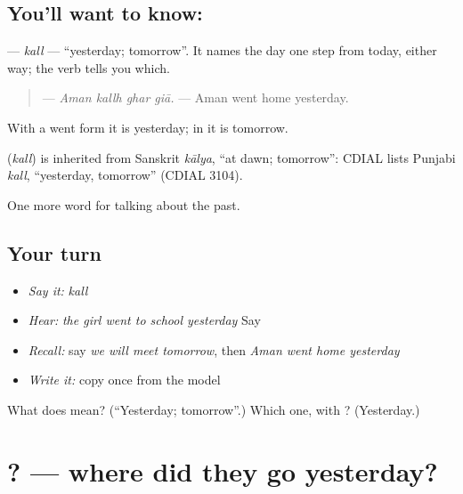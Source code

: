 \subsection*{You'll want to know: }
\textbf{} — \emph{kall} — \textquotedblleft{}yesterday; tomorrow\textquotedblright{}. It names the day one step from today, either way; the verb tells you which.

\begin{quote}
\textbf{   } — \emph{Aman kallh ghar giā.} — Aman went home yesterday.
\end{quote}

With a went form it is yesterday; in \textbf{ } it is tomorrow.

\begin{cousinweb}
\textbf{} (\emph{kall}) is inherited from Sanskrit \emph{kālya}, \textquotedblleft{}at dawn; tomorrow\textquotedblright{}: CDIAL lists Punjabi \emph{kall}, \textquotedblleft{}yesterday, tomorrow\textquotedblright{} (CDIAL 3104).
\end{cousinweb}

\begin{grammarlens}[title={What you've built}]
One more word for talking about the past.
\end{grammarlens}

\subsection*{Your turn}
\begin{itemize}
\raggedright
  \item \emph{Say it:} \emph{kall}
  \item \emph{Hear:} \emph{the girl went to school yesterday} Say \textbf{   }
  \item \emph{Recall:} say \emph{we will meet tomorrow}, then \emph{Aman went home yesterday}
  \item \emph{Write it:} copy \textbf{} once from the model
\end{itemize}

\begin{tcolorbox}[breakable,colback=teal!4,colframe=teal!35!black,title={Before you move on}]
What does \textbf{} mean? (\textquotedblleft{}Yesterday; tomorrow\textquotedblright{}.) Which one, with \textbf{}? (Yesterday.)
\end{tcolorbox}
\section[\texorpdfstring{\pa{ਉਹ} \pa{ਕੱਲ੍ਹ} \pa{ਕਿੱਥੇ} \pa{ਗਏ}? (uh kallh kitthe gae?)}{ਉਹ ਕੱਲ੍ਹ ਕਿੱਥੇ ਗਏ? (uh kallh kitthe gae?)}]{   ? — where did they go yesterday?}

